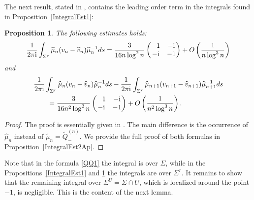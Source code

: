\documentclass[11pt]{article}
\numberwithin{equation}{section}
\newcommand{\tQ}{{\widetilde Q}}
\newcommand{\hmu}{{\widehat \mu}}
\newcommand{\tmu}{{\widetilde \mu}}
\newcommand{\bv}{v}
\newcommand{\hv}{{\widehat v}}
\newcommand{\Sigr}{\Sigma^r}
\newcommand{\I}{\mathrm{i}}
\newtheorem{Proposition}[Theorem]{Proposition}
 { \theoremstyle{definition}
\newtheorem{Definition}[Theorem]{Definition}
\newtheorem{Note}[Theorem]{Note}
\newtheorem{Example}[Theorem]{Example}
\newtheorem{Remark}[Theorem]{Remark} }
\numberwithin{equation}{section}
\begin{document}
The next result, stated in \cite[Section~5]{CD}, contains the leading order term in the integrals found in Proposition~\ref{IntegralEst1}:
\begin{Proposition}\label{IntegralEst2}
 The following estimates holds:
\begin{align*}
\frac{1}{2\pi\I} \int_{\Sigr} \hmu_n(\bv_n-\hv_n)\hmu_n^{-1} {\rm d}s = \frac{3}{16n \log^2n} \begin{pmatrix}
\phantom{-}1 & -\I\\
-\I & -1
\end{pmatrix} + O\left(\frac{1}{n\log^3 n}\right)
\end{align*}
and
\begin{align*}
 & \frac{1}{2\pi\I} \int_{\Sigr} \hmu_n(\bv_n-\hv_n)\hmu_n^{-1} {\rm d}s - \frac{1}{2\pi\I} \int_{\Sigr} \hmu_{n+1}(\bv_{n+1}-\hv_{n+1})\hmu^{-1}_{n+1} {\rm d}s
 \\
 &\qquad= \frac{3}{16n^2 \log^2n} \begin{pmatrix}
\phantom{-}1 & -\I\\
-\I & -1
\end{pmatrix} + O\left(\frac{1}{n^2\log^3 n}\right).
\end{align*}
\end{Proposition}
\begin{proof}
The proof is essentially given in \cite[Propositions~C.3 and C.4]{CD}. The main difference is the occurrence of $\hmu_n$ instead of $\tmu_n = \tQ^{(n)}_-$. We provide the full proof of both formulas in Proposition~\ref{IntegralEst2Ap}.
\end{proof}

Note that in the formula \eqref{QQ1} the integral is over $\Sigma$, while in the Propositions~\ref{IntegralEst1} and \ref{IntegralEst2} the integrals are over $\Sigr$. It remains to show that the remaining integral over $ \Sigma^U = \Sigma\cap U$, which is localized around the point $-1$, is negligible. This is the content of the next lemma.
\end{document}
